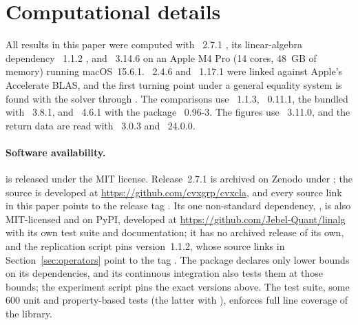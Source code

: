 \section*{Computational details}

All results in this paper were computed with ~2.7.1 \citep{cvxcla},
its linear-algebra dependency ~1.1.2 \citep{cvxlinalg}, and
~3.14.6 on an Apple M4 Pro (14 cores, 48~GB of memory) running
macOS~15.6.1. ~2.4.6 and ~1.17.1 were linked against Apple's
Accelerate BLAS, and the first turning point under a general equality system is found
with the  solver through . The comparisons use
~1.1.3, ~0.11.1, the  bundled with
~3.8.1, and ~4.6.1 with the  package
~0.96-3. The figures use ~3.11.0, and the return data are
read with ~3.0.3 and ~24.0.0.

\paragraph{Software availability.}
 is released under the MIT license. Release~2.7.1 is
archived on Zenodo \citep{cvxcla} under ; the source is
developed at \url{https://github.com/cvxgrp/cvxcla}, and every source link in this paper
points to the release tag . Its one non-standard dependency,
 \citep{cvxlinalg}, is also MIT-licensed and on PyPI, developed at
\url{https://github.com/Jebel-Quant/linalg} with its own test suite and documentation;
it has no archived release of its own, and the replication script pins version~1.1.2,
whose source links in Section~\ref{sec:operators} point to the tag . The package declares only lower bounds on its
dependencies, and its continuous integration also tests them at those bounds; the
experiment script pins the exact versions above. The test suite, some $600$ unit and
property-based tests (the latter with ), enforces full line coverage of
the library.

